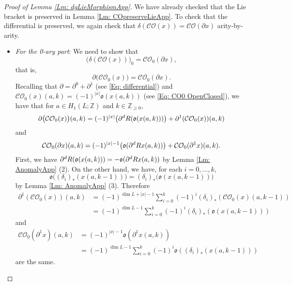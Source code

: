 \documentclass[10pt,a4paper]{amsart}
\newcommand{\CO}{\mathcal{CO}}
\newcommand{\Z}{\mathbb{Z}}
\newcommand{\dR}{\textup{dR}}
\begin{document}
\begin{proof}
	[Proof of Lemma \ref{Lm: dgLieMorphismApp}]
We have already checked that the Lie bracket is preserved in Lemma \ref{Lm: COpreserveLieApp}. To check that the differential is preserved, we again check that $\delta(\CO(x)) = \CO(\partial x)$ arity-by-arity.

\begin{itemize}
	\item 	\emph{For the 0-ary part}: We need to show that \[\big(\delta(\CO(x))\big)_0 = \CO_0(\partial x),\]
	that is, 
	\[
		\partial \big(\CO_0(x)\big)= \CO_0(\partial x).
	\]
	Recalling that $\partial = \partial^0+\partial^1$ (see \eqref{Eq: differential}) and $\CO_0(x)(a,k)= (-1)^{|x|}\mathfrak{o}(x(a,k))$ (see \eqref{Eq: CO0 OpenClosed}), we have that for $a\in H_1(L;\Z)$ and $k\in \Z_{\geq 0}$,
	\begin{align*}
		\partial\big(\CO_0(x)\big)(a,k) =  (-1)^{|x|}\big( \partial^\dR( \mathfrak{o}(x(a,k)))\big)+ \partial^1(\CO_0(x))(a,k) 
	\end{align*}
	and 
	\begin{align*}
		\CO_0(\partial x)(a,k) =(-1)^{|x|-1}\big(\mathfrak{o}(\partial^\dR x (a,k))\big) + \CO_0(\partial^1 x)(a,k).
	\end{align*}
	First, we have $\partial^\dR(\mathfrak{o}(x(a,k))) = - \mathfrak{o}(\partial^\dR x(a,k))$ by Lemma \ref{Lm: AnomalyApp} (2). 
	On the other hand, we have, for each $i=0,\dots, k$, \[\mathfrak{o}\big((\delta_i)_* (x(a,k-1))\big)  = (\delta_i)_* \big( \mathfrak{o}(x(a,k-1))\big)
	\]by Lemma \ref{Lm: AnomalyApp} (3). Therefore 
	\begin{align*}
		\partial^1( \CO_0(x))(a,k) &= (-1)^{\dim L + |x|-1}\sum_{i=0}^k(-1)^i (\delta_i)_*(\CO_0(x)(a,k-1))\\
		&= (-1)^{\dim L -1}\sum_{i=0}^k (-1)^i (\delta_i)_* (\mathfrak{o}(x(a,k-1)))
	\end{align*}
	and 
	\begin{align*}
		\CO_0(\partial^1 x)(a,k)&= (-1)^{|x|-1}\mathfrak{o}(\partial^1 x(a,k))\\
		 &=  (-1)^{\dim L -1}\sum_{i=0}^k (-1)^i \mathfrak{o}((\delta_i)_* (x(a,k-1)))
	\end{align*}
	are the same.
\bigskip
	


\end{itemize}
\end{proof}
\end{document}
